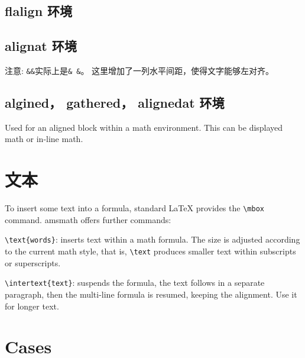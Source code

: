 
\subsection{{\ttfamily flalign} 环境}


\subsection{{\ttfamily alignat} 环境}



注意: \verb|&&|实际上是\verb|& &|。 这里增加了一列水平间距，使得文字能够左对齐。

\subsection{{\ttfamily algined， gathered， alignedat} 环境}

Used for an aligned block within a math environment. This can be displayed math or in-line math.


\section{文本}

To insert some text into a formula, standard LaTeX provides the \verb|\mbox| command. 
amsmath offers further commands:

\begin{description}
  \item \verb|\text{words}|: inserts text within a math formula. The size is adjusted according to the current math style, that is, \verb|\text| produces smaller text within subscripts or superscripts.
  \item \verb|\intertext{text}|: suspends the formula, the text follows in a separate paragraph, then the multi-line formula is resumed, keeping the alignment. Use it for longer text.
\end{description}


\section{Cases}

